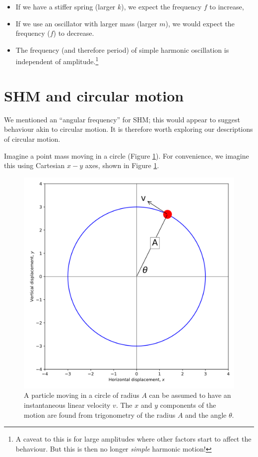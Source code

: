 \documentclass[
]{book}
\providecommand{\tightlist}{%
  \setlength{\itemsep}{0pt}\setlength{\parskip}{0pt}}
\begin{document}
\begin{itemize}
\tightlist
\item
  If we have a stiffer spring (larger \(k\)), we expect the frequency \(f\) to increase,
\item
  If we use an oscillator with larger mass (larger \(m\)), we would expect the frequency (\(f\)) to decrease.
\item
  The frequency (and therefore period) of simple harmonic oscillation is independent of amplitude.\footnote{A caveat to this is for large amplitudes where other factors start to affect the behaviour. But this is then no longer \emph{simple} harmonic motion!}
\end{itemize}

\hypertarget{sec-ch1-shmcircmotion1}{%
\section{SHM and circular motion}\label{sec-ch1-shmcircmotion1}}

We mentioned an ``angular frequency'' for SHM; this would appear to suggest behaviour akin to circular motion. It is therefore worth exploring our descriptions of circular motion.

Imagine a point mass moving in a circle (Figure \ref{fig:ch1-circularmotion1}). For convenience, we imagine this using Cartesian \(x-y\) axes, shown in Figure \ref{fig:ch1-circularmotion1}.

\begin{figure}

{\centering \includegraphics[width=0.7\linewidth]{visualisations/ch1-shmcircular} 

}

\caption{A particle moving in a circle of radius $A$ can be assumed to have an instantaneous linear velocity $v$. The $x$ and $y$ components of the motion are found from trigonometry of the radius $A$ and the angle $θ$.}\label{fig:ch1-circularmotion1}
\end{figure}
\end{document}
